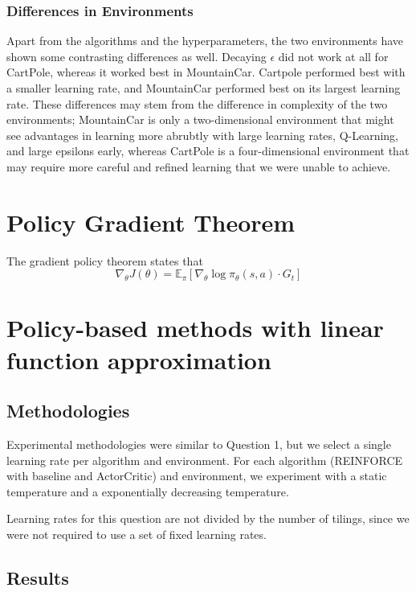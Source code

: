 \documentclass{article}
\begin{document}
\subsubsection{Differences in Environments}
Apart from the algorithms and the hyperparameters, the two environments have shown some
contrasting differences as well. Decaying $\epsilon$ did not work at all for CartPole, whereas
it worked best in MountainCar. Cartpole performed best with a smaller learning rate, and
MountainCar performed best on its largest learning rate. These differences may stem from the
difference in complexity of the two environments; MountainCar is only a two-dimensional environment
that might see advantages in learning more abrubtly with large learning rates, Q-Learning, and large epsilons early, whereas CartPole is a four-dimensional environment
that may require more careful and refined learning that we were unable to achieve.

\section{Policy Gradient Theorem}

The gradient policy theorem states that
\[
\nabla_\theta J(\theta) = \mathbb{E}_{\pi} \left[ \nabla_{\theta} \log \pi_{\theta}(s, a) \cdot G_t \right]
\]









\section{Policy-based methods with linear function approximation}

\subsection{Methodologies}

Experimental methodologies were similar to Question 1, but we select a single learning rate per
algorithm and environment. For each algorithm (REINFORCE with baseline and ActorCritic) and environment, we experiment with a static temperature and a
exponentially decreasing temperature.

Learning rates for this question are not divided by the number of tilings, since we were not
required to use a set of fixed learning rates.

\subsection{Results}
\end{document}
